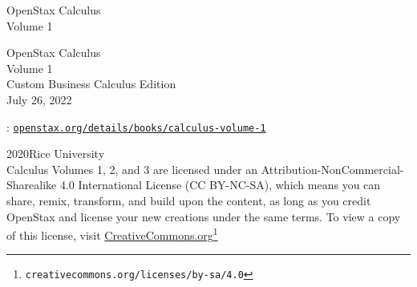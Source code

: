 \documentclass[oneside,10pt,]{book}
\newcommand{\titlepagefont}{\relax}
\newcommand{\mono}[1]{\texttt{#1}}
\numberwithin{equation}{section}
\begin{document}
\raggedbottom
\frontmatter
\thispagestyle{empty}
{\titlepagefont\centering
\vspace*{0.28\textheight}
{\Huge OpenStax Calculus}\\[2\baselineskip]
{\LARGE Volume 1}\\
}
\clearpage
\thispagestyle{empty}
{\titlepagefont\centering
\vspace*{0.14\textheight}
{\Huge OpenStax Calculus}\\[\baselineskip]
{\LARGE Volume 1}\\[3\baselineskip]
{\Large Custom Business Calculus Edition}\\[3\baselineskip]
{\Large July 26, 2022}\\}
\clearpage
\thispagestyle{empty}
\hypertarget{g:colophon:idm1622950888}{}
: \href{https:\slash{}\slash{}openstax.org\slash{}details\slash{}books\slash{}calculus-volume-1}{\mono{openstax.org/details/books/calculus-volume-1}}\par\medskip
\noindent\textcopyright{}2020\quad{}Rice University\\[0.5\baselineskip]
 Calculus Volumes 1, 2, and 3 are licensed under an Attribution-NonCommercial-Sharealike 4.0 International License (CC BY-NC-SA), which means you can share, remix, transform, and build upon the content, as long as you credit OpenStax and license your new creations under the same terms. To view a copy of this license, visit \href{http://creativecommons.org/licenses/by-sa/4.0/}{CreativeCommons.org}\footnote{\nolinkurl{creativecommons.org/licenses/by-sa/4.0}\label{g:fn:idm1622771432}}\par\medskip
{}
\null\clearpage
%
%
\typeout{************************************************}
\typeout{************************************************}
%
\end{document}
